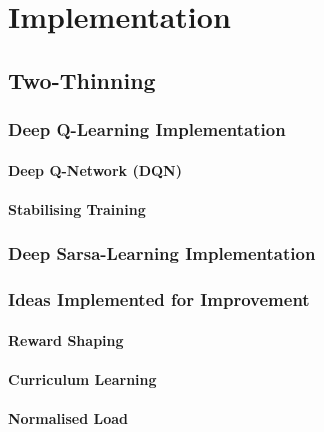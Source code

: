 \chapter{Implementation}\label{implementation}

\ifpdf
    \graphicspath{{Chapter3/Figs/Raster/}{Chapter3/Figs/PDF/}{Chapter3/Figs/}}
\else
    \graphicspath{{Chapter3/Figs/Vector/}{Chapter3/Figs/}}
\fi


\section{Two-Thinning}


\subsection{Deep Q-Learning Implementation}


\subsubsection{Deep Q-Network (DQN)}


\subsubsection{Stabilising Training}


\subsection{Deep Sarsa-Learning Implementation}


\subsection{Ideas Implemented for Improvement}


\subsubsection{Reward Shaping}


\subsubsection{Curriculum Learning}


\subsubsection{Normalised Load}


